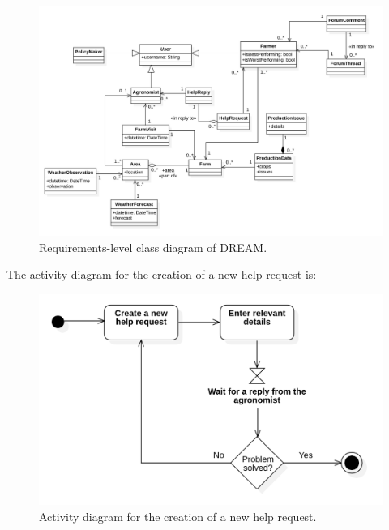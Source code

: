 \documentclass{article}
\begin{document}
\begin{figure}
    \centering
    \includegraphics[scale=0.2]{class_diagrams/requirements-level class diagram.png}
    \caption{Requirements-level class diagram of DREAM.}
\end{figure}
\clearpage

The activity diagram for the creation of a new help request is:
\begin{figure}[H]
    \centering
	\includegraphics[scale=0.35]{state_machine_diagrams/statediagram1.png}
    \caption{Activity diagram for the creation of a new help request.}
\end{figure}
\end{document}
